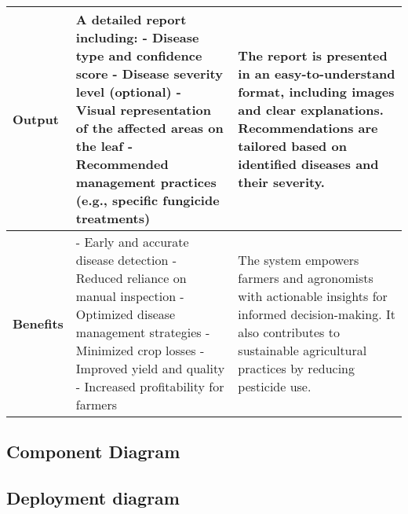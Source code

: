 \begin{table}[H]
{\begin{tabular}{|p{3.5cm}|p{7cm}|p{5cm}|}
            \textbf{Output} & A detailed report including: \newline - Disease type and confidence score \newline - Disease severity level (optional) \newline - Visual representation of the affected areas on the leaf \newline - Recommended management practices (e.g., specific fungicide treatments) & The report is presented in an easy-to-understand format, including images and clear explanations. Recommendations are tailored based on identified diseases and their severity. \\ \hline
            
            \textbf{Benefits} & - Early and accurate disease detection \newline - Reduced reliance on manual inspection \newline - Optimized disease management strategies \newline - Minimized crop losses \newline - Improved yield and quality \newline - Increased profitability for farmers & The system empowers farmers and agronomists with actionable insights for informed decision-making. It also contributes to sustainable agricultural practices by reducing pesticide use. \\ \hline
            
        \end{tabular}
    }
\end{table}



\subsection{Component Diagram}
\subsection{Deployment diagram}